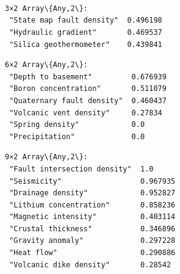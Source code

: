 \documentclass[11pt]{article}
\begin{document}
    \begin{Verbatim}[commandchars=\\\{\}]

    \end{Verbatim}

    \begin{center}
    \end{center}
    { \hspace*{\fill} \\}

    \begin{center}
    \end{center}
    { \hspace*{\fill} \\}

    \begin{Verbatim}[commandchars=\\\{\}]

    \end{Verbatim}

    \begin{center}
    \end{center}
    { \hspace*{\fill} \\}


    \begin{Verbatim}[commandchars=\\\{\}]
3×2 Array\{Any,2\}:
 "State map fault density"  0.496198
 "Hydraulic gradient"       0.469537
 "Silica geothermometer"    0.439841
    \end{Verbatim}



    \begin{Verbatim}[commandchars=\\\{\}]
6×2 Array\{Any,2\}:
 "Depth to basement"         0.676939
 "Boron concentration"       0.511079
 "Quaternary fault density"  0.460437
 "Volcanic vent density"     0.27834
 "Spring density"            0.0
 "Precipitation"             0.0
    \end{Verbatim}



    \begin{Verbatim}[commandchars=\\\{\}]
9×2 Array\{Any,2\}:
 "Fault intersection density"  1.0
 "Seismicity"                  0.967935
 "Drainage density"            0.952827
 "Lithium concentration"       0.858236
 "Magnetic intensity"          0.403114
 "Crustal thickness"           0.346896
 "Gravity anomaly"             0.297228
 "Heat flow"                   0.290886
 "Volcanic dike density"       0.28542
    \end{Verbatim}
\end{document}
